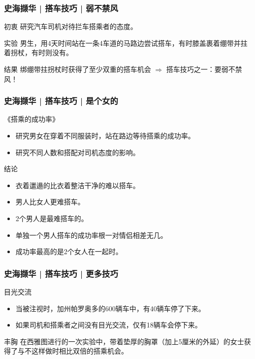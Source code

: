 \begin{frame}
  \frametitle{史海撷华 | 搭车技巧 | 弱不禁风}
  \begin{block}{初衷}
    研究汽车司机对待拦车搭乘者的态度。
  \end{block}
  \pause
  \begin{block}{实验}
    男生，用4天时间站在一条4车道的马路边尝试搭车，有时膝盖裹着绷带并拄着拐杖，有时则没有。
  \end{block}
  \pause
  \begin{block}{结果}
    绑绷带拄拐杖时获得了至少双重的搭车机会 $\Longrightarrow$ 搭车技巧之一：要弱不禁风！
  \end{block}
\end{frame}

\begin{frame}
  \frametitle{史海撷华 | 搭车技巧 | 是个女的}
  \begin{block}{《搭乘的成功率》}
    \begin{itemize}
      \item 研究男女在穿着不同服装时，站在路边等待搭乘的成功率。
      \item 研究不同人数和搭配对司机态度的影响。
    \end{itemize}
  \end{block}
  \pause
  \begin{block}{结论}
    \begin{itemize}
      \item 衣着邋遢的比衣着整洁干净的难以搭车。
      \item 男人比女人更难搭车。
      \item 2个男人是最难搭车的。
      \item 单独一个男人搭车的成功率根一对情侣相差无几。
      \item 成功率最高的是2个女人在一起时。
    \end{itemize}
  \end{block}
\end{frame}

\begin{frame}
  \frametitle{史海撷华 | 搭车技巧 | 更多技巧}
  \begin{block}{目光交流}
    \begin{itemize}
      \item 当被注视时，加州帕罗奥多的600辆车中，有40辆车停了下来。
      \item 如果司机和搭乘者之间没有目光交流，仅有18辆车会停下来。
    \end{itemize}
  \end{block}
  \pause
  \begin{block}{丰胸}
在西雅图进行的一次实验中，带着垫厚的胸罩（加上5厘米的外延）的女士获得了与不这样做时相比双倍的搭乘机会。 
  \end{block}
\end{frame}

